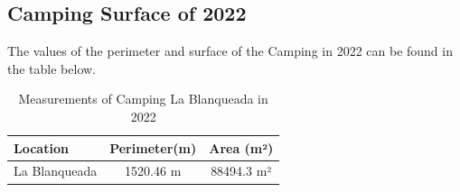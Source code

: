 \subsection{Camping Surface of 2022}
The values of the perimeter and surface of the Camping in 2022 can be found in the table below. 

\begin{table}[H]
\centering
\caption{Measurements of Camping La Blanqueada in 2022}
\label{tab:Measurements of Camping La Blanqueada in 2022}
\begin{tabular}{l S[table-format=5.2] S[table-format=5.2]}
\toprule
Location & Perimeter(m) &  Area (m²) \\
\midrule
La Blanqueada & 1520.46 m & 88494.3 m²\\
\bottomrule
\end{tabular}
\end{table}

